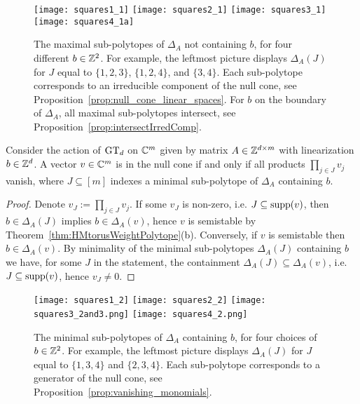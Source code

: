 \begin{figure}[htbp]
	\centering
	\texttt{[image: squares1\_1]} \qquad 
	\texttt{[image: squares2\_1]}
	\qquad
	\texttt{[image: squares3\_1]}
	\qquad
	\texttt{[image: squares4\_1a]}
	\caption{{\cite[Figure~1]{DiscretePaper}} The maximal sub-polytopes of $\Delta_A$ not containing $b$, for four different $b \in \mathbb Z^2$.
		For example, the leftmost picture displays $\Delta_A(J)$ for $J$ equal to $\{1,2,3\}$, $\{1, 2, 4\}$, and $\{3, 4\}$.
		Each sub-polytope corresponds to an irreducible component of the null cone, see Proposition~\ref{prop:null_cone_linear_spaces}. For $b$ on the boundary of $\Delta_A$, all maximal sub-polytopes intersect, see Proposition~\ref{prop:intersectIrredComp}.}
	\label{fig:max_not_containing_b}
\end{figure}

\begin{prop}
	\label{prop:vanishing_monomials}
	Consider the action of $\operatorname{GT}_d$ on $\mathbb C^m$ given by matrix $A \in \mathbb Z^{d \times m}$ with linearization $b \in \mathbb Z^d$. 
	A vector $v \in \mathbb C^m$ is in the null cone if and only if all products $\prod_{j \in J} v_j$ vanish, where $J \subseteq [m]$ indexes a minimal sub-polytope of $\Delta_A$ containing $b$.
\end{prop}

\begin{proof}
	Denote $v_J := \prod_{j \in J} v_j$. If some $v_J$ is non-zero, i.e. $J \subseteq \operatorname{supp}(v)$, then $b \in \Delta_A(J)$ implies $b \in \Delta_A(v)$, hence $v$ is semistable by Theorem~\ref{thm:HMtorusWeightPolytope}(b). Conversely, if $v$ is semistable then $b \in \Delta_A(v)$. By minimality of the minimal sub-polytopes $\Delta_A(J)$ containing $b$ we have, for some $J$ in the statement, the containment $\Delta_A(J) \subseteq \Delta_A(v)$, i.e. $J \subseteq \operatorname{supp}(v)$, hence $v_J \neq 0$. 
\end{proof}

\begin{figure}[htbp]
	\centering
	\texttt{[image: squares1\_2]} \qquad 
	\texttt{[image: squares2\_2]}
	\qquad 
	\texttt{[image: squares3\_2and3.png]}
	\qquad 
	\texttt{[image: squares4\_2.png]}
	\caption{{\cite[Figure~2]{DiscretePaper}} The minimal sub-polytopes of $\Delta_A$ containing $b$, for four choices of $b \in \mathbb Z^2$.
		For example, the leftmost picture displays $\Delta_A(J)$ for $J$ equal to $\{1,3,4\}$ and $\{2,3, 4\}$.
		Each sub-polytope corresponds to a generator of the null cone, see Proposition~\ref{prop:vanishing_monomials}.}
	\label{fig:minimal_containing_b}
\end{figure}

